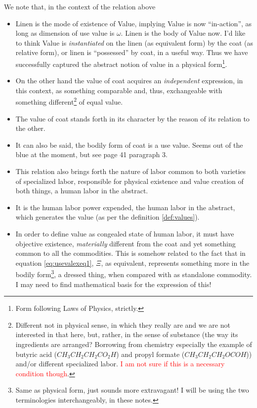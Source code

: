 \documentclass[12pt]{extarticle}
\theoremstyle{definition}
\newenvironment{remark}[1][Remark]{\begin{trivlist}
\item[\hskip \labelsep {\bfseries #1}]}{\end{trivlist}}
\begin{document}
\begin{remark}
  \label{rem:relform}
  We note that, in the context of the relation above
  \begin{itemize}
  \item Linen is the mode of existence of Value, implying Value is now ``in-action'', as long as dimension of use value is $\omega$.  Linen is the body of Value now.  I'd like to think Value is \emph{instantiated} on the linen (as equivalent form) by the coat (as relative form), or linen is ``possessed'' by coat, in a useful way.   Thus we have successfully captured the abstract notion of value in a physical form\footnote{Form following Laws of Physics, strictly.}.
  \item On the other hand the value of coat acquires an \emph{independent} expression, in this context, as something comparable and, thus, exchangeable with something different\footnote{Different not in physical sense, in which they really are and we are not interested in that here, but, rather, in the sense of substance (the way its ingredients are arranged?  Borrowing from chemistry especially the example of butyric acid ($CH_3CH_2CH_2CO_2H$) and propyl formate ($CH_3CH_2CH_2OCOH$)) and/or different specialized labor.  \textcolor{red}{I am not sure if this is a necessary condition though}.} of equal value.
  \item The value of coat stands forth in its character by the reason of its relation to the other.
  \item It can also be said, the bodily form of coat is a use value.  Seems out of the blue at the moment, but see page 41 paragraph 3.
  \item This relation also brings forth the nature of labor common to both varieties of specialized labor, responsible for physical existence and value creation of both things, a human labor in the abstract.
    \item It is the human labor power expended, the human labor in the abstract, which generates the value (as per the definition \ref{def:values}).
    \item In order to define value as congealed state of human labor, it must have objective existence, \emph{materially} different from the coat and yet something common to all the commodities.  This is somehow related to the fact that in equation \ref{eq:usevalexeq1}, $\Xi$, as equivalent, represents something more in the bodily form\footnote{Same as physical form, just sounds more extravagant!  I will be using the two terminologies interchangeably, in these notes.}, a dressed thing, when compared with as standalone commodity.  I may need to find mathematical basis for the expression of this!

\end{itemize}
\end{remark}
\end{document}
